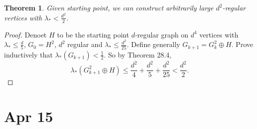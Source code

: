 \documentclass[a4paper]{article}
\newtheorem{thm}{Theorem}[section]
\begin{document}
\begin{thm}
    Given starting point, we can construct arbitrarily large $d^2$-regular vertices with $\lambda_*<\frac{d^2}{2}$.
\end{thm}
\begin{proof}
    Denoet $H$ to be the starting point $d$-regular graph on $d^4$ vertices with $\lambda_*\leq \frac{d}{5}$, $G_0=H^2$, $d^2$ regular and $\lambda_*\leq \frac{d^2}{25}$. Define generally $G_{k+1}=G_k^2\oplus H$. Prove inductively that $\lambda_*(G_{k+1})<\frac{1}{2}$. So by Theorem 28.4, 
    \[
    \lambda_*(G_{k+1}^2\oplus H)\leq \frac{d^2}{4}+\frac{d^2}{5}+\frac{d^2}{25}<\frac{d^2}{2}
    .\] 
\end{proof}
\newpage
\section{Apr 15}
\end{document}

